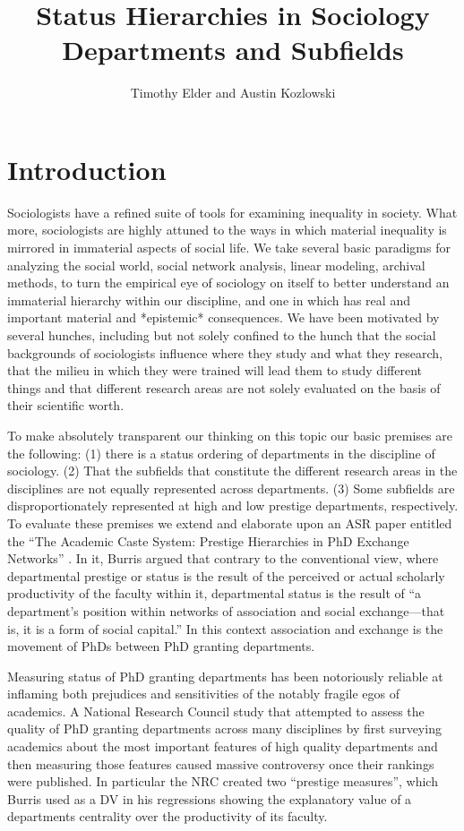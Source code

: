 \documentclass{article}
\title{Status Hierarchies in Sociology Departments and Subfields}
\author{Timothy Elder and Austin Kozlowski}
\begin{document}
\maketitle

\section{Introduction}

Sociologists have a refined suite of tools for examining inequality in society. What more, sociologists are highly attuned to the ways in which material inequality is mirrored in immaterial aspects of social life. We take several basic paradigms for analyzing the social world, social network analysis, linear modeling, archival methods, to turn the empirical eye of sociology on itself to better understand an immaterial hierarchy within our discipline, and one in which has real and important material and *epistemic* consequences. We have been motivated by several hunches, including but not solely confined to the hunch that the social backgrounds of sociologists influence where they study and what they research, that the milieu in which they were trained will lead them to study different things and that different research areas are not solely evaluated on the basis of their scientific worth.

To make absolutely transparent our thinking on this topic our basic premises are the following: (1) there is a status ordering of departments in the discipline of sociology. (2) That the subfields that constitute the different research areas in the disciplines are not equally represented across departments. (3) Some subfields are disproportionately represented at high and low prestige departments, respectively. To evaluate these premises we extend and elaborate upon an ASR paper entitled the ``The Academic Caste System: Prestige Hierarchies in PhD Exchange Networks'' \cite{burris_academic_2004}. In it, Burris argued that contrary to the conventional view, where departmental prestige or status is the result of the perceived or actual scholarly productivity of the faculty within it, departmental status is the result of ``a department's position within networks of association and social exchange—that is, it is a form of social capital.'' In this context association and exchange is the movement of PhDs between PhD granting departments.

Measuring status of PhD granting departments has been notoriously reliable at inflaming both prejudices and sensitivities of the notably fragile egos of academics. A National Research Council study that attempted to assess the quality of PhD granting departments across many disciplines by first surveying academics about the most important features of high quality departments and then measuring those features caused massive controversy once their rankings were published. In particular the NRC created two ``prestige measures'', which Burris used as a DV in his regressions showing the explanatory value of a departments centrality over the productivity of its faculty.
\end{document}
